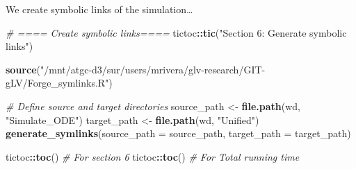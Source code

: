 \documentclass[
]{article}
\newenvironment{Shaded}{\begin{snugshade}}{\end{snugshade}}
\newcommand{\AttributeTok}[1]{\textcolor[rgb]{0.13,0.29,0.53}{#1}}
\newcommand{\CommentTok}[1]{\textcolor[rgb]{0.56,0.35,0.01}{\textit{#1}}}
\newcommand{\FunctionTok}[1]{\textcolor[rgb]{0.13,0.29,0.53}{\textbf{#1}}}
\newcommand{\NormalTok}[1]{#1}
\newcommand{\OtherTok}[1]{\textcolor[rgb]{0.56,0.35,0.01}{#1}}
\newcommand{\SpecialCharTok}[1]{\textcolor[rgb]{0.81,0.36,0.00}{\textbf{#1}}}
\newcommand{\StringTok}[1]{\textcolor[rgb]{0.31,0.60,0.02}{#1}}
\begin{document}
We create symbolic links of the simulation\ldots{}

\begin{Shaded}
\begin{Highlighting}[]
\CommentTok{\# ==== Create symbolic links====}
\NormalTok{tictoc}\SpecialCharTok{::}\FunctionTok{tic}\NormalTok{(}\StringTok{"Section 6: Generate symbolic links"}\NormalTok{)}

\FunctionTok{source}\NormalTok{(}\StringTok{"/mnt/atgc{-}d3/sur/users/mrivera/glv{-}research/GIT{-}gLV/Forge\_symlinks.R"}\NormalTok{)}

\CommentTok{\# Define source and target directories}
\NormalTok{source\_path }\OtherTok{\textless{}{-}} \FunctionTok{file.path}\NormalTok{(wd, }\StringTok{"Simulate\_ODE"}\NormalTok{)}
\NormalTok{target\_path }\OtherTok{\textless{}{-}} \FunctionTok{file.path}\NormalTok{(wd, }\StringTok{"Unified"}\NormalTok{)}
\FunctionTok{generate\_symlinks}\NormalTok{(}\AttributeTok{source\_path =}\NormalTok{ source\_path, }\AttributeTok{target\_path =}\NormalTok{ target\_path)}

\NormalTok{tictoc}\SpecialCharTok{::}\FunctionTok{toc}\NormalTok{() }\CommentTok{\# For section 6}
\NormalTok{tictoc}\SpecialCharTok{::}\FunctionTok{toc}\NormalTok{() }\CommentTok{\# For Total running time}
\end{Highlighting}
\end{Shaded}
\end{document}
